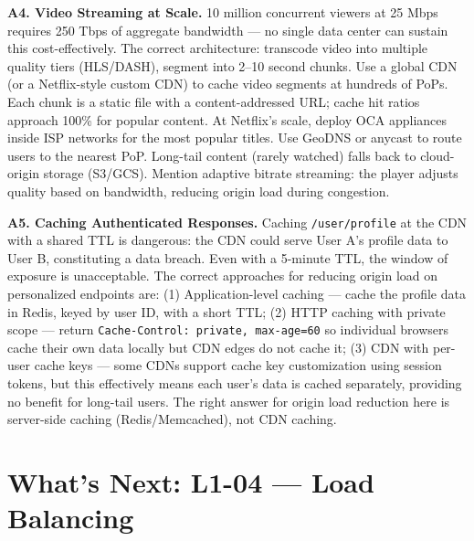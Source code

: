 \documentclass[11pt,a4paper]{article}
\begin{document}
\begin{answerbox}
\medskip
\textbf{A4. Video Streaming at Scale.}
10 million concurrent viewers at 25 Mbps requires 250 Tbps of aggregate bandwidth --- no single data center can sustain this cost-effectively. The correct architecture: transcode video into multiple quality tiers (HLS/DASH), segment into 2--10 second chunks. Use a global CDN (or a Netflix-style custom CDN) to cache video segments at hundreds of PoPs. Each chunk is a static file with a content-addressed URL; cache hit ratios approach 100\% for popular content. At Netflix's scale, deploy OCA appliances inside ISP networks for the most popular titles. Use GeoDNS or anycast to route users to the nearest PoP. Long-tail content (rarely watched) falls back to cloud-origin storage (S3/GCS). Mention adaptive bitrate streaming: the player adjusts quality based on bandwidth, reducing origin load during congestion.

\medskip
\textbf{A5. Caching Authenticated Responses.}
Caching \texttt{/user/profile} at the CDN with a shared TTL is dangerous: the CDN could serve User A's profile data to User B, constituting a data breach. Even with a 5-minute TTL, the window of exposure is unacceptable. The correct approaches for reducing origin load on personalized endpoints are: (1) Application-level caching --- cache the profile data in Redis, keyed by user ID, with a short TTL; (2) HTTP caching with private scope --- return \texttt{Cache-Control: private, max-age=60} so individual browsers cache their own data locally but CDN edges do not cache it; (3) CDN with per-user cache keys --- some CDNs support cache key customization using session tokens, but this effectively means each user's data is cached separately, providing no benefit for long-tail users. The right answer for origin load reduction here is server-side caching (Redis/Memcached), not CDN caching.
\end{answerbox}

\section{What's Next: L1-04 --- Load Balancing}
\end{document}
